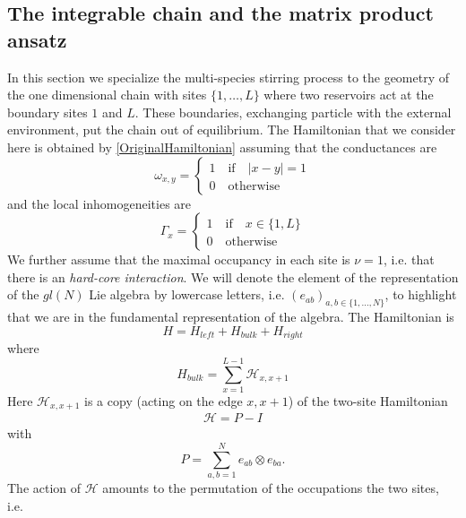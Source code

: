 \documentclass[11pt]{article}
\numberwithin{equation}{section}
\numberwithin{equation}{subsection}
\newcommand{\id}{I}
\begin{document}
\subsection{The integrable chain and the matrix product ansatz}
In this section we specialize the multi-species stirring process to the geometry of the one dimensional chain with sites $\{1,\ldots,L\}$ where two reservoirs act at the boundary sites $1$ and $L$. These boundaries, exchanging particle with the external environment, put the chain out of equilibrium. The Hamiltonian that we consider here is obtained by \eqref{OriginalHamiltonian} assuming that the conductances are
\begin{equation}
    \omega_{x,y}=\begin{cases}
    1 \quad \text{if}\quad |x-y|=1\\
    0\quad \text{otherwise}
    \end{cases}
\end{equation}
and the local inhomogeneities are
\begin{equation}
    \Gamma_{x}=\begin{cases}
        1\quad \text{if} \quad x\in \{1,L\}\\
        0\quad \text{otherwise}
    \end{cases}
    \end{equation}
We further assume that the maximal occupancy in each site is $\nu=1$, i.e. that there is an \textit{hard-core interaction}.
We will denote the element of the representation of the $gl(N)$ Lie algebra by lowercase letters, i.e. $(e_{ab})_{a,b\in\{1,\ldots,N\}}$, to highlight that we are in  the fundamental representation of the algebra.
The Hamiltonian is
\begin{equation}\label{hamiltonian}
	H=H_{left}+H_{bulk}+H_{right}
\end{equation}
where
\begin{equation}
    H_{bulk}=\sum_{x=1}^{L-1}\mathcal{H}_{x,x+1}
\end{equation}
Here $\mathcal{H}_{x,x+1}$  is a copy (acting on the edge $x,x+1$) of the two-site Hamiltonian
\begin{equation}
	\begin{split}
		\mathcal{H}=P-\id
	\end{split}
\end{equation}
with 
\begin{equation}
	P=\sum_{a,b=1}^Ne_{ab}\otimes e_{ba}.
\end{equation} 
The action of $\mathcal{H}$ amounts to the permutation of the occupations the two sites, i.e.
\end{document}
